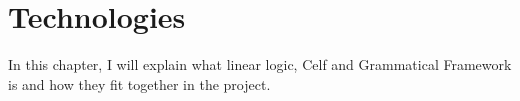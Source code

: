 \chapter{Technologies}
\label{03}

In this chapter, I will explain what linear logic, Celf and Grammatical Framework is and how they fit together in the project.



